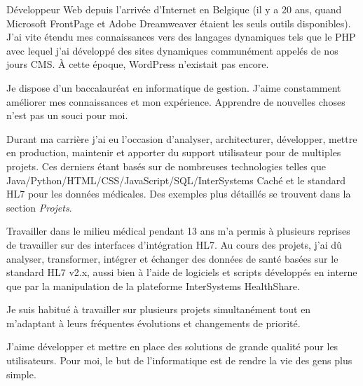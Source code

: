 

\begin{cvparagraph}

Développeur Web depuis l'arrivée d'Internet en Belgique (il y a 20 ans, quand Microsoft FrontPage et Adobe Dreamweaver étaient les seuls outils disponibles). J'ai vite étendu mes connaissances vers des langages dynamiques tels que le PHP avec lequel j'ai développé des sites dynamiques communément appelés de nos jours CMS. À cette époque, WordPress n'existait pas encore.

Je dispose d'un baccalauréat en informatique de gestion. J'aime constamment améliorer mes connaissances et mon expérience. Apprendre de nouvelles choses n'est pas un souci pour moi.

Durant ma carrière j'ai eu l'occasion  d'analyser, architecturer, développer, mettre en production, maintenir et apporter du support utilisateur pour de multiples projets. Ces derniers étant basés sur de nombreuses technologies telles que Java/Python/HTML/CSS/JavaScript/SQL/InterSystems Caché et le standard HL7 pour les données médicales. Des exemples plus détaillés se trouvent dans la section \emph{Projets}.


Travailler dans le milieu médical pendant 13 ans m'a permis à plusieurs reprises de travailler sur des interfaces d'intégration HL7. Au cours des projets, j'ai dû analyser, transformer, intégrer et échanger des données de santé basées sur le standard HL7 v2.x, aussi bien à l'aide de logiciels et scripts développés en interne que par la manipulation de la plateforme InterSystems HealthShare.

Je suis habitué à travailler sur plusieurs projets simultanément tout en m'adaptant à leurs fréquentes évolutions et changements de priorité.


J'aime développer et mettre en place des solutions de grande qualité pour les utilisateurs.
Pour moi, le but de l'informatique est de rendre la vie des gens plus simple.
\end{cvparagraph}
